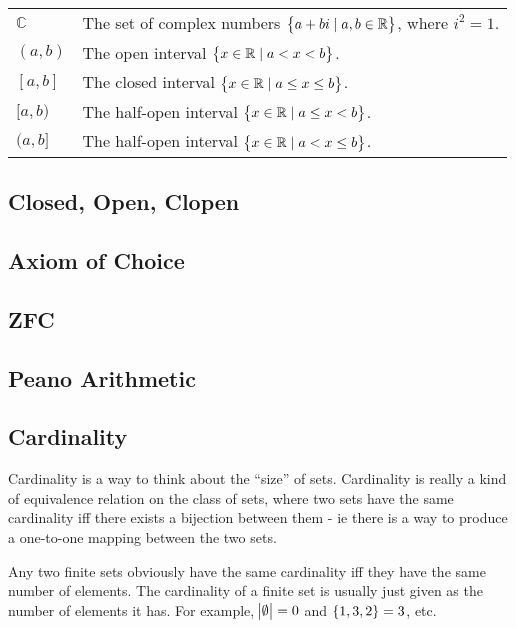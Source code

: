 \documentclass[a4paper,11pt]{article}
\begin{document}
\begin{longtable}{ll}
    $\mathbb{C}$ & The set of complex numbers
                   $\set{a + bi \mid a, b \in \mathbb{R}}$, where $i^2 = 1$.\\
    $(a, b)$ & The open interval $\set{x \in \mathbb{R} \mid a < x < b}$.\\
    $[a, b]$ & The closed interval
               $\set{x \in \mathbb{R} \mid a \le x \le b}$.\\
    $[a, b)$ & The half-open interval
               $\set{x \in \mathbb{R} \mid a \le x < b}$.\\
    $(a, b]$ & The half-open interval
               $\set{x \in \mathbb{R} \mid a < x \le b}$.\\
    \bottomrule
    \end{longtable}

    \subsection{Closed, Open, Clopen}

    \subsection{Axiom of Choice}

    \subsection{ZFC}

    \subsection{Peano Arithmetic}

    \subsection{Cardinality}

    Cardinality is a way to think about the ``size'' of sets. Cardinality is
    really a kind of equivalence relation on the class of sets, where two sets
    have the same cardinality iff there exists a bijection between them - ie
    there is a way to produce a one-to-one mapping between the two sets.

    Any two finite sets obviously have the same cardinality iff they have the
    same number of elements. The cardinality of a finite set is usually just
    given as the number of elements it has. For example, $\abs \emptyset = 0$
    and $\set{1, 3, 2} = 3$, etc.
\end{document}
